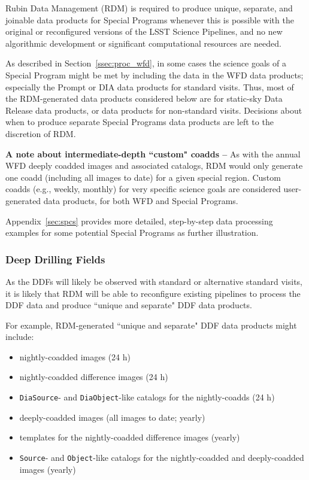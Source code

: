 Rubin Data Management (RDM) is required to produce unique, separate, and 
joinable data products for Special Programs whenever this is possible with the 
original or reconfigured versions of the LSST Science Pipelines, and no new 
algorithmic development or significant computational resources are needed.

As described in Section~\ref{ssec:proc_wfd}, in some cases the science goals 
of a Special Program might be met by including the data in the WFD data 
products; especially the Prompt or DIA data products for standard visits.
Thus, most of the RDM-generated data products considered below are for 
static-sky Data Release data products, or data products for non-standard visits.
Decisions about when to produce separate Special Programs data products are 
left to the discretion of RDM.

\textbf{A note about intermediate-depth ``custom" coadds -- }
As with the annual WFD deeply coadded images and associated catalogs, RDM would 
only generate one coadd (including all images to date) for a given special region.
Custom coadds (e.g., weekly, monthly) for very specific science goals are considered 
user-generated data products, for both WFD and Special Programs.

Appendix~\ref{sec:spcs} provides more detailed, step-by-step data processing 
examples for some potential Special Programs as further illustration. 


\subsubsection{Deep Drilling Fields}

As the DDFs will likely be observed with standard or alternative standard 
visits, it is likely that RDM will be able to reconfigure existing pipelines 
to process the DDF data and produce ``unique and separate" DDF data products.

For example, RDM-generated ``unique and separate" DDF data products might 
include:
\begin{itemize}
\item nightly-coadded images (24 h)
\item nightly-coadded difference images (24 h)
\item {\tt DiaSource}- and {\tt DiaObject}-like catalogs for the nightly-coadds (24 h)
\item deeply-coadded images (all images to date; yearly)
\item templates for the nightly-coadded difference images (yearly)
\item {\tt Source}- and {\tt Object}-like catalogs for the nightly-coadded and deeply-coadded images (yearly)
\end{itemize}


